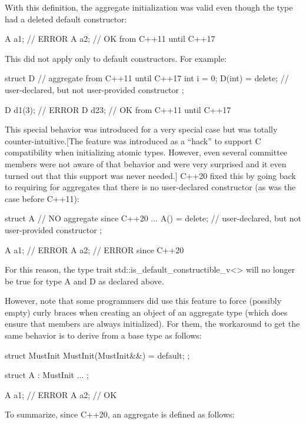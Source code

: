 With this definition, the aggregate initialization was valid even though the type had a deleted default constructor:

\begin{cpp}
A a1; // ERROR
A a2{}; // OK from C++11 until C++17
\end{cpp}

This did not apply only to default constructors. For example:

\begin{cpp}
struct D { // aggregate from C++11 until C++17
	int i = 0;
	D(int) = delete; // user-declared, but not user-provided constructor
};

D d1(3); // ERROR
D d2{3}; // OK from C++11 until C++17
\end{cpp}

This special behavior was introduced for a very special case but was totally counter-intuitive.[The feature was introduced as a “hack” to support C compatibility when initializing atomic types. However, even several committee members were not aware of that behavior and were very surprised and it even turned out that this support was never needed.] C++20 fixed this by going back to requiring for aggregates that there is no user-declared constructor (as was the case before C++11):

\begin{cpp}
struct A { // NO aggregate since C++20
	...
	A() = delete; // user-declared, but not user-provided constructor
};

A a1; // ERROR
A a2{}; // ERROR since C++20
\end{cpp}

For this reason, the type trait std::is\_default\_constructible\_v<> will no longer be true for type A and D as declared above.

However, note that some programmers did use this feature to force (possibly empty) curly braces when creating an object of an aggregate type (which does ensure that members are always initialized). For them, the workaround to get the same behavior is to derive from a base type as follows:

\begin{cpp}
struct MustInit {
	MustInit(MustInit&&) = default;
};

struct A : MustInit {
	...
};

A a1; // ERROR
A a2{}; // OK
\end{cpp}

To summarize, since C++20, an aggregate is defined as follows:

